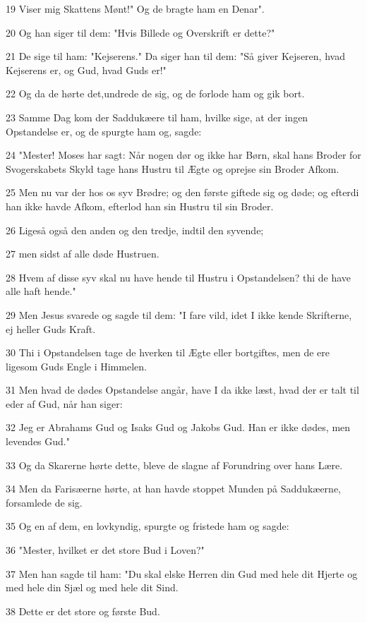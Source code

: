 \par 19 Viser mig Skattens Mønt!" Og de bragte ham en Denar".
\par 20 Og han siger til dem: "Hvis Billede og Overskrift er dette?"
\par 21 De sige til ham: "Kejserens." Da siger han til dem: "Så giver Kejseren, hvad Kejserens er, og Gud, hvad Guds er!"
\par 22 Og da de hørte det,undrede de sig, og de forlode ham og gik bort.
\par 23 Samme Dag kom der Saddukæere til ham, hvilke sige, at der ingen Opstandelse er, og de spurgte ham og, sagde:
\par 24 "Mester! Moses har sagt: Når nogen dør og ikke har Børn, skal hans Broder for Svogerskabets Skyld tage hans Hustru til Ægte og oprejse sin Broder Afkom.
\par 25 Men nu var der hos os syv Brødre; og den første giftede sig og døde; og efterdi han ikke havde Afkom, efterlod han sin Hustru til sin Broder.
\par 26 Ligeså også den anden og den tredje, indtil den syvende;
\par 27 men sidst af alle døde Hustruen.
\par 28 Hvem af disse syv skal nu have hende til Hustru i Opstandelsen? thi de have alle haft hende."
\par 29 Men Jesus svarede og sagde til dem: "I fare vild, idet I ikke kende Skrifterne, ej heller Guds Kraft.
\par 30 Thi i Opstandelsen tage de hverken til Ægte eller bortgiftes, men de ere ligesom Guds Engle i Himmelen.
\par 31 Men hvad de dødes Opstandelse angår, have I da ikke læst, hvad der er talt til eder af Gud, når han siger:
\par 32 Jeg er Abrahams Gud og Isaks Gud og Jakobs Gud. Han er ikke dødes, men levendes Gud."
\par 33 Og da Skarerne hørte dette, bleve de slagne af Forundring over hans Lære.
\par 34 Men da Farisæerne hørte, at han havde stoppet Munden på Saddukæerne, forsamlede de sig.
\par 35 Og en af dem, en lovkyndig, spurgte og fristede ham og sagde:
\par 36 "Mester, hvilket er det store Bud i Loven?"
\par 37 Men han sagde til ham: "Du skal elske Herren din Gud med hele dit Hjerte og med hele din Sjæl og med hele dit Sind.
\par 38 Dette er det store og første Bud.

